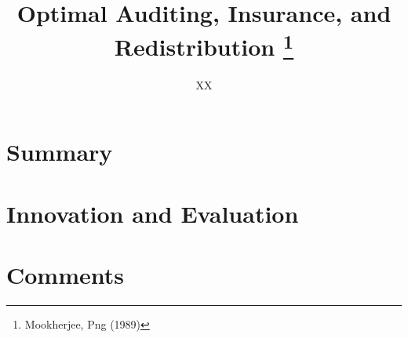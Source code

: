 \documentclass[12pt,runningheads]{article}
\begin{document}

\title{Optimal Auditing, Insurance, and Redistribution \footnote{Mookherjee, Png (1989)}} 
\author{XX}
\maketitle

\section{Summary}

\section{Innovation and Evaluation}

\section{Comments}
\end{document}
